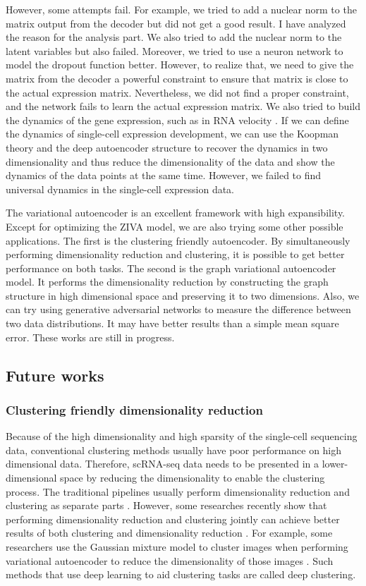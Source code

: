 However, some attempts fail. For example, we tried to add a nuclear norm to the matrix output from the decoder but did not get a good result. I have analyzed the reason for the analysis part. We also tried to add the nuclear norm to the latent variables but also failed. Moreover, we tried to use a neuron network to model the dropout function better. However, to realize that, we need to give the matrix from the decoder a powerful constraint to ensure that matrix is close to the actual expression matrix. Nevertheless, we did not find a proper constraint, and the network fails to learn the actual expression matrix. We also tried to build the dynamics of the gene expression, such as in RNA velocity \cite{la2018rna}. If we can define the dynamics of single-cell expression development, we can use the Koopman theory \cite{morton2018deep} and the deep autoencoder structure to recover the dynamics in two dimensionality \cite{lusch2018deep} and thus reduce the dimensionality of the data and show the dynamics of the data points at the same time. However, we failed to find universal dynamics in the single-cell expression data.  

The variational autoencoder is an excellent framework with high expansibility. Except for optimizing the ZIVA model, we are also trying some other possible applications. The first is the clustering friendly autoencoder. By simultaneously performing dimensionality reduction and clustering, it is possible to get better performance on both tasks. The second is the graph variational autoencoder model. It performs the dimensionality reduction by constructing the graph structure in high dimensional space and preserving it to two dimensions. Also, we can try using generative adversarial networks to measure the difference between two data distributions. It may have better results than a simple mean square error. These works are still in progress.

\subsection{Future works}

\subsubsection{Clustering friendly dimensionality reduction}
Because of the high dimensionality and high sparsity of the single-cell sequencing data, conventional clustering methods usually have poor performance on high dimensional data. Therefore, scRNA-seq data needs to be presented in a lower-dimensional space by reducing the dimensionality to enable the clustering process. The traditional pipelines usually perform dimensionality reduction and clustering as separate parts \cite{wu2020tools}. However, some researches recently show that performing dimensionality reduction and clustering jointly can achieve better results of both clustering and dimensionality reduction \cite{yang2017towards}. For example, some researchers use the Gaussian mixture model to cluster images when performing variational autoencoder to reduce the dimensionality of those images \cite{prasad2020variational}. Such methods that use deep learning to aid clustering tasks are called deep clustering.

